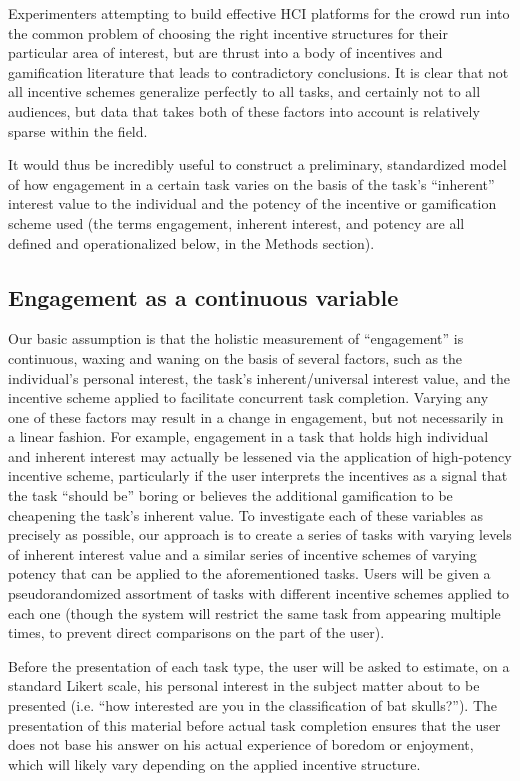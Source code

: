 \documentclass{sigchi}
\begin{document}
Experimenters attempting to build effective HCI platforms for the crowd run into the common problem of choosing the right incentive structures for their particular area of interest, but are thrust into a body of incentives and gamification literature that leads to contradictory conclusions. It is clear that not all incentive schemes generalize perfectly to all tasks, and certainly not to all audiences, but data that takes both of these factors into account is relatively sparse within the field.

It would thus be incredibly useful to construct a preliminary, standardized model of how engagement in a certain task varies on the basis of the task's “inherent” interest value to the individual and the potency of the incentive or gamification scheme used (the terms engagement, inherent interest, and potency are all defined and operationalized below, in the Methods section). 

\subsection{Engagement as a continuous variable}

Our basic assumption is that the holistic measurement of “engagement” is continuous, waxing and waning on the basis of several factors, such as the individual’s personal interest, the task’s inherent/universal interest value, and the incentive scheme applied to facilitate concurrent task completion. Varying any one of these factors may result in a change in engagement, but not necessarily in a linear fashion. For example, engagement in a task that holds high individual and inherent interest may actually be lessened via the application of high-potency incentive scheme, particularly if the user interprets the incentives as a signal that the task “should be” boring or believes the additional gamification to be cheapening the task’s inherent value. 
To investigate each of these variables as precisely as possible, our approach is to create a series of tasks with varying levels of inherent interest value and a similar series of incentive schemes of varying potency that can be applied to the aforementioned tasks. Users will be given a pseudorandomized assortment of tasks with different incentive schemes applied to each one (though the system will restrict the same task from appearing multiple times, to prevent direct comparisons on the part of the user). 

Before the presentation of each task type, the user will be asked to estimate, on a standard Likert scale, his personal interest in the subject matter about to be presented (i.e. “how interested are you in the classification of bat skulls?”). The presentation of this material before actual task completion ensures that the user does not base his answer on his actual experience of boredom or enjoyment, which will likely vary depending on the applied incentive structure. 
\end{document}
